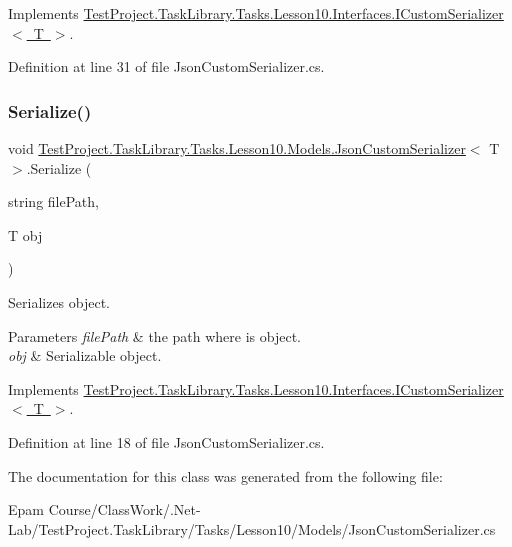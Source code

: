 Implements \mbox{\hyperlink{interface_test_project_1_1_task_library_1_1_tasks_1_1_lesson10_1_1_interfaces_1_1_i_custom_serializer}{Test\+Project.\+Task\+Library.\+Tasks.\+Lesson10.\+Interfaces.\+I\+Custom\+Serializer$<$ T $>$}}.



Definition at line 31 of file Json\+Custom\+Serializer.\+cs.

\mbox{\label{class_test_project_1_1_task_library_1_1_tasks_1_1_lesson10_1_1_models_1_1_json_custom_serializer_a7e32b960835ef12d7bb9d253a27244ec}} 
\subsubsection{\texorpdfstring{Serialize()}{Serialize()}}
{\footnotesize\ttfamily void \mbox{\hyperlink{class_test_project_1_1_task_library_1_1_tasks_1_1_lesson10_1_1_models_1_1_json_custom_serializer}{Test\+Project.\+Task\+Library.\+Tasks.\+Lesson10.\+Models.\+Json\+Custom\+Serializer}}$<$ T $>$.Serialize (\begin{DoxyParamCaption}\item[{string}]{file\+Path,  }\item[{T}]{obj }\end{DoxyParamCaption})}



Serializes object. 


\begin{DoxyParams}{Parameters}
{\em file\+Path} & the path where is object.\\
\hline
{\em obj} & Serializable object.\\
\hline
\end{DoxyParams}


Implements \mbox{\hyperlink{interface_test_project_1_1_task_library_1_1_tasks_1_1_lesson10_1_1_interfaces_1_1_i_custom_serializer}{Test\+Project.\+Task\+Library.\+Tasks.\+Lesson10.\+Interfaces.\+I\+Custom\+Serializer$<$ T $>$}}.



Definition at line 18 of file Json\+Custom\+Serializer.\+cs.



The documentation for this class was generated from the following file\+:\begin{DoxyCompactItemize}
\item 
Epam Course/\+Class\+Work/.\+Net-\/\+Lab/\+Test\+Project.\+Task\+Library/\+Tasks/\+Lesson10/\+Models/Json\+Custom\+Serializer.\+cs\end{DoxyCompactItemize}
